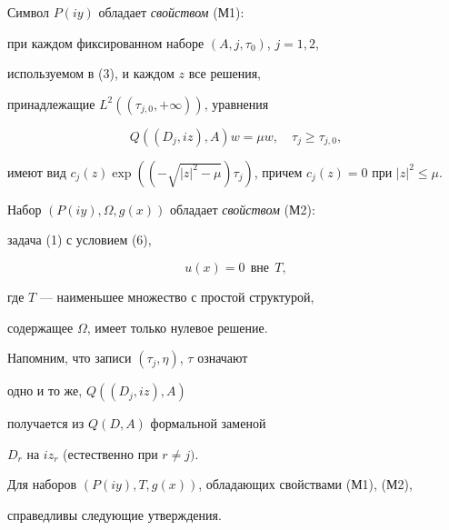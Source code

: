 Символ $ P(iy) $ обладает {\it свойством} (М1):





при каждом фиксированном наборе $(A, j, \tau_{0})$, $j=1, 2$,


используемом в (3), и каждом $z$ все решения, 


принадлежащие $ L^{2}((\tau_{j, 0}, +\infty))$, уравнения


\begin{equation}


Q((D_{j}, iz), A)w =\mu w, \quad \tau_{j} \ge \tau_{j, 0},


\end{equation}


имеют вид $ c_{j}(z) \exp ((-\sqrt{| z | ^{2}-


\mu}) \tau_{j} )$, причем $ c_{j}(z)=0$ при $| z |^{2} \le \mu$.





Набор $( P(iy), \Omega, g(x)) $ обладает {\it свойством} (М2):





задача (1) с условием (6),


$$




u(x)=0 \ \ \text{вне} \ \ T, 




$$


где $T$ --- наименьшее множество с простой структурой, 


содержащее $\Omega$, имеет только нулевое решение. 





Напомним, что записи $ (\tau_{j}, \eta)$, $\tau $ означают


одно и то же,  $ Q((D_{j}, iz), A) $


получается из $ Q(D, A) $ формальной заменой


$D_{r} $ на $iz_{r}$ (естественно при $r \ne j). $





Для наборов $(P(iy), T, g(x))$, обладающих свойствами (М1), (М2),


справедливы следующие утверждения. 






